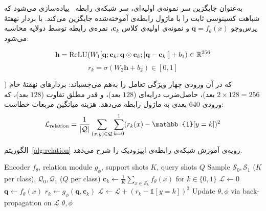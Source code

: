 به‌عنوان جایگزین سر نمونه‌ی اولیه‌ای، سر شبکه‌ی رابطه~\cite{sung2018learning} پیاده‌سازی می‌شود که شباهت کسینوسی ثابت را با ماژول رابطه‌ی آموخته‌شده جایگزین می‌کند. با بردار نهفتۀ پرس‌وجو $\mathbf{q} = f_\theta(x)$ و نمونه‌ی اولیه‌ی کلاس $\mathbf{c}_k$، نمره‌ی رابطه توسط  دولایه محاسبه می‌شود:

\begin{equation}
\mathbf{h} = \text{ReLU}(W_1 [\mathbf{q}; \mathbf{c}_k; \mathbf{q} \odot \mathbf{c}_k; |\mathbf{q} - \mathbf{c}_k|] + b_1) \in \mathbb{R}^{256}
\end{equation}
\begin{equation}
r_k = \sigma(W_2 \mathbf{h} + b_2) \in [0,1]
\end{equation}

که در آن ورودی چهار ویژگی تعامل را به‌هم می‌چسباند: بردارهای نهفتۀ خام ($2 \times 128 = 256$ بعد)، حاصل‌ضرب درایه‌ای ($128$ بعد)، و قدر مطلق تفاوت ($128$ بعد)، که ورودی $640$-بعدی به ماژول رابطه می‌دهد. هزینه میانگین مربعات خطاست:
\begin{equation}
\mathcal{L}_{\text{\lr{relation}}} = \frac{1}{|\mathcal{Q}|} \sum_{(x,y) \in \mathcal{Q}} \sum_{k=0}^{1} (r_k(x) - \mathbb{1}[y=k])^2
\end{equation}

الگوریتم~\ref{alg:relation} رویه‌ی آموزش شبکه‌ی رابطه‌ی اپیزودیک را شرح می‌دهد.

\begin{algorithm}[htbp]
\begin{latin}\footnotesize
\caption{آموزش اپیزودیک شبکۀ رابطه}
\label{alg:relation}
\begin{algorithmic}[1]
\Require Encoder $f_\theta$, relation module $g_\phi$, support shots $K$, query shots $Q$
\State Sample $\mathcal{S}_0, \mathcal{S}_1$ ($K$ per class), $\mathcal{Q}_0, \mathcal{Q}_1$ ($Q$ per class)
\State $\mathbf{c}_k \gets \frac{1}{K}\sum_{x \in \mathcal{S}_k} f_\theta(x)$ for $k \in \{0,1\}$
\State $\mathcal{L} \gets 0$
\State $\mathbf{q} \gets f_\theta(x)$
\State $r_k \gets g_\phi(\mathbf{q}, \mathbf{c}_k)$
\State $\mathcal{L} \gets \mathcal{L} + (r_k - \mathbb{1}[y=k])^2$
\EndFor
\EndFor
\State Update $\theta, \phi$ via backpropagation on $\mathcal{L}$
\EndFor
\State \Return $\theta, \phi$
\end{algorithmic}
\end{latin}
\end{algorithm}

